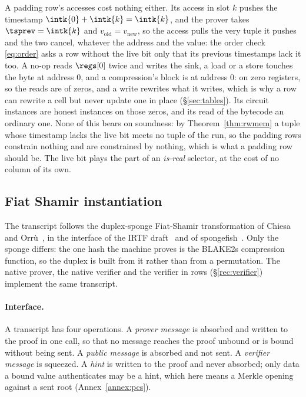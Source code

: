 A padding row's accesses cost nothing either. Its access in slot $k$ pushes the timestamp $\intk{0}+\intk{k}=\intk{k}$, and the prover takes $\tsprev=\intk{k}$ and $v_{\mathrm{old}}=v_{\mathrm{new}}$, so the access pulls the very tuple it pushes and the two cancel, whatever the address and the value: the order check \eqref{eq:order} asks a row without the live bit only that its previous timestamps lack it too. A no-op reads $\regs[0]$ twice and writes the sink, a load or a store touches the byte at address $0$, and a compression's block is at address $0$: on zero registers, so the reads are of zeros, and a write rewrites what it writes, which is why a row can rewrite a cell but never update one in place (\S\ref{sec:tables}). Its circuit instances are honest instances on those zeros, and its read of the bytecode an ordinary one. None of this bears on soundness: by Theorem~\ref{thm:rwmem} a tuple whose timestamp lacks the live bit meets no tuple of the run, so the padding rows constrain nothing and are constrained by nothing, which is what a padding row should be. The live bit plays the part of an \emph{is-real} selector, at the cost of no column of its own.

\subsection{Fiat Shamir instantiation}\label{sec:e2e-fiat-shamir}

The transcript follows the duplex-sponge Fiat-Shamir transformation of Chiesa and Orr\`u~\cite{CO25}, in the interface of the IRTF draft~\cite{IRTF-FS} and of spongefish~\cite{spongefish}. Only the sponge differs: the one hash the machine proves is the BLAKE2s compression function, so the duplex is built from it rather than from a permutation. The native prover, the native verifier and the verifier in rows (\S\ref{rec:verifier}) implement the same transcript.

\paragraph{Interface.} A transcript has four operations. A \emph{prover message} is absorbed and written to the proof in one call, so that no message reaches the proof unbound or is bound without being sent. A \emph{public message} is absorbed and not sent. A \emph{verifier message} is squeezed. A \emph{hint} is written to the proof and never absorbed; only data a bound value authenticates may be a hint, which here means a Merkle opening against a sent root (Annex~\ref{annex:pcs}).

